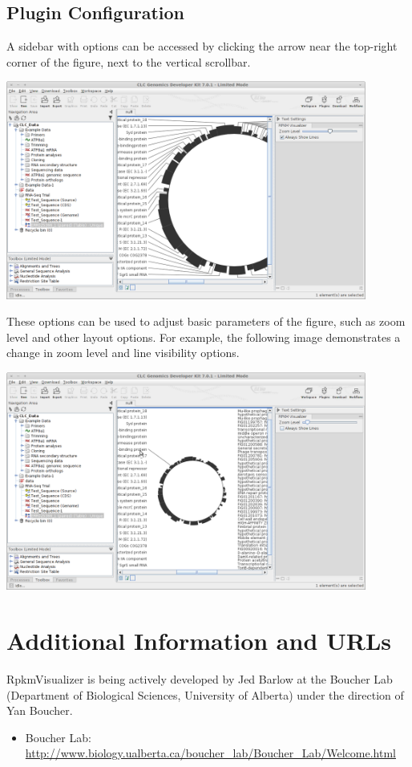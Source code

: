 \documentclass[12pt,letterpaper]{article}
\begin{document}
\subsection{Plugin Configuration}

A sidebar with options can be accessed by clicking the arrow near the top-right
corner of the figure, next to the vertical scrollbar.

\begin{center}
    \includegraphics[width=32em]{sidebar.png}
\end{center}

These options can be used to adjust basic parameters of the figure, such as
zoom level and other layout options.  For example, the following image
demonstrates a change in zoom level and line visibility options.

\begin{center}
    \includegraphics[width=32em]{sidebar-changed.png}
\end{center}

\section{Additional Information and URLs}

RpkmVisualizer is being actively developed by Jed Barlow at the Boucher Lab
(Department of Biological Sciences, University of Alberta) under the direction
of Yan Boucher.

\begin{itemize}
    \item
        Boucher Lab: \url{http://www.biology.ualberta.ca/boucher\_lab/Boucher\_Lab/Welcome.html}
\end{itemize}
\end{document}
